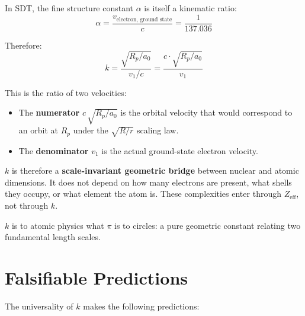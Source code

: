 In SDT, the fine structure constant $\alpha$ is itself a kinematic ratio:
\begin{equation}
  \alpha = \frac{v_{\text{electron, ground state}}}{c} = \frac{1}{137.036}
\end{equation}

Therefore:
\begin{equation}
  k = \frac{\sqrt{R_p / a_0}}{v_1 / c} = \frac{c \cdot \sqrt{R_p / a_0}}{v_1}
\end{equation}

This is the ratio of two velocities:
\begin{itemize}
  \item The \textbf{numerator} $c\,\sqrt{R_p/a_0}$ is the orbital velocity that would correspond to an orbit at $R_p$ under the $\sqrt{R/r}$ scaling law.
  \item The \textbf{denominator} $v_1$ is the actual ground-state electron velocity.
\end{itemize}

$k$ is therefore a \textbf{scale-invariant geometric bridge} between nuclear and atomic dimensions.  It does not depend on how many electrons are present, what shells they occupy, or what element the atom is.  These complexities enter through $Z_{\text{eff}}$, not through $k$.

$k$ is to atomic physics what $\pi$ is to circles: a pure geometric constant relating two fundamental length scales.


\section{Falsifiable Predictions}

The universality of $k$ makes the following predictions:

